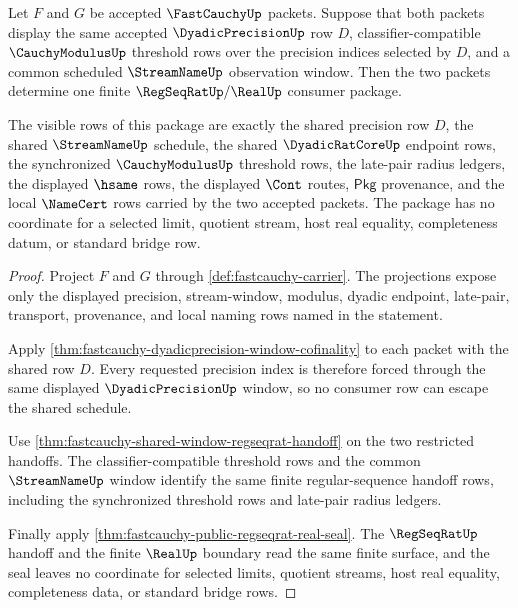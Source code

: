 \begin{theorem}
\label{thm:fastcauchy-modulus-synchronization-common-regseqrat-window}
Let $F$ and $G$ be accepted $\FastCauchyUp$ packets. Suppose that both packets
display the same accepted $\DyadicPrecisionUp$ row $D$, classifier-compatible
$\CauchyModulusUp$ threshold rows over the precision indices selected by $D$,
and a common scheduled $\StreamNameUp$ observation window. Then the two packets
determine one finite $\RegSeqRatUp/\RealUp$ consumer package.

The visible rows of this package are exactly the shared precision row $D$, the
shared $\StreamNameUp$ schedule, the shared $\DyadicRatCoreUp$ endpoint rows,
the synchronized $\CauchyModulusUp$ threshold rows, the late-pair radius
ledgers, the displayed $\hsame$ rows, the displayed $\Cont$ routes,
$\mathsf{Pkg}$ provenance, and the local $\NameCert$ rows carried by the two
accepted packets. The package has no coordinate for a selected limit, quotient
stream, host real equality, completeness datum, or standard bridge row.
\end{theorem}
\begin{proof}
Project $F$ and $G$ through \autoref{def:fastcauchy-carrier}. The projections
expose only the displayed precision, stream-window, modulus, dyadic endpoint,
late-pair, transport, provenance, and local naming rows named in the statement.

Apply \autoref{thm:fastcauchy-dyadicprecision-window-cofinality} to each
packet with the shared row $D$. Every requested precision index is therefore
forced through the same displayed $\DyadicPrecisionUp$ window, so no consumer
row can escape the shared schedule.

Use \autoref{thm:fastcauchy-shared-window-regseqrat-handoff} on the two
restricted handoffs. The classifier-compatible threshold rows and the common
$\StreamNameUp$ window identify the same finite regular-sequence handoff rows,
including the synchronized threshold rows and late-pair radius ledgers.

Finally apply \autoref{thm:fastcauchy-public-regseqrat-real-seal}. The
$\RegSeqRatUp$ handoff and the finite $\RealUp$ boundary read the same finite
surface, and the seal leaves no coordinate for selected limits, quotient
streams, host real equality, completeness data, or standard bridge rows.
\end{proof}


